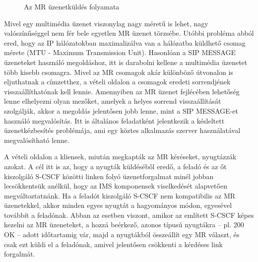 \begin{figure}[htbp]
\center
{}
\caption{Az MR üzenetküldés folyamata}
\label{fig:mrflow}
\end{figure}

Mivel egy multimédia üzenet viszonylag nagy méretű is lehet, nagy valószínűséggel nem fér bele egyetlen MR üzenet törzsébe. Utóbbi probléma abból ered, hogy az IP hálózatokban maximalizálva van a hálózatba küldhető csomag mérete (MTU - Maximum Transmission Unit). Hasonlóan a SIP MESSAGE üzeneteket használó megoldáshoz, itt is darabolni kellene a multimédia üzenetet több kisebb csomagra. Mivel az MR csomagok akár különböző útvonalon is eljuthatnak a címzetthez, a vételi oldalon a csomagok eredeti sorrendjének visszaállíthatónak kell lennie. Amennyiben az MR üzenet fejlécében lehetőség lenne elhelyezni olyan mezőket, amelyek a helyes sorrend visszaállítását szolgálják, akkor a megoldás jelentősen jobb lenne, mint a SIP MESSAGE-et használó megvalósítás. Itt is általános feladatként jelentkezik a késleltett üzenetkézbesítés problémája, ami egy köztes alkalmazás szerver használatával megvalósítható lenne.

A vételi oldalon a kliensek, miután megkapták az MR kéréseket, nyugtázzák azokat. A cél itt is az, hogy a nyugták küldéséből eredő, a feladó és az őt kiszolgáló S-CSCF közötti linken folyó üzenetforgalmat minél jobban lecsökkentsük anélkül, hogy az IMS komponensek viselkedését alapvetően megváltoztatnánk. Ha a feladót kiszolgáló S-CSCF nem kompatibilis az MR üzenetekkel, akkor minden egyes nyugtát a hagyományos módon, egyesével továbbít a feladónak. Abban az esetben viszont, amikor az említett S-CSCF képes kezelni az MR üzeneteket, a hozzá beérkező, azonos típusú nyugtákra -- pl. 200 OK -- adott időtartamig vár, majd a nyugtákból összeállít egy MR választ, és csak ezt küldi el a feladónak, amivel jelentősen csökkenti a kérdéses link forgalmát.

